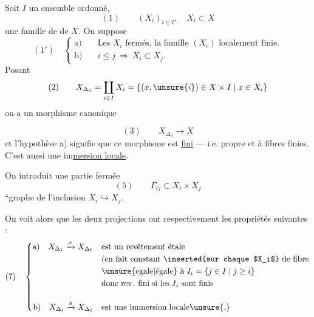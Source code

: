 Soit $I$ un ensemble ordonné, 
\[
(1)\qquad (X_i)_{i\in I},\quad X_i\subset X
\]
une famille de  de $X$. On suppose
\[
(1')\quad\left\{\begin{aligned}
\text{a)}\quad&\text{Les }X_i\text{ fermés, la famille }(X_i)\text{ localement finie.}\\
\text{b)}\quad&i\leq j\ \Longrightarrow\ X_i\subset X_j.
\end{aligned}\right.
\]
Posant
\[
(2)\qquad X_{\Delta_0}=\coprod_{i\in I}X_i
=\{(x,\unsure{i})\in X\times I\mid x\in X_i\}
\]
on a un morphisme canonique

\[
(3)\qquad X_{\Delta_0}\longrightarrow X
\]
et l'hypothèse a) signifie que ce
morphisme  est \uline{fini} --- i.e. propre
 et à fibres finies. C'est aussi une
im\uline{mersion locale}.

On introduit une partie fermée
\[
(5)\qquad \Gamma_{ij}\subset X_i\times X_j
\]
``graphe de l'inclusion $X_i\hookrightarrow X_j$.

On voit alors que les deux projections
ont respectivement les propriétés suivantes :
\[
(7)\quad\left\{\begin{aligned}
\text{a)}\quad X_{\Delta_1}\xrightarrow{\sigma}X_{\Delta_0}&\quad\text{est un revêtement étale}\\
&\quad\text{(en fait constant \inserted{sur chaque $X_i$} de fibre}\\
&\quad\text{\unsure{egale|égale} à }I_i=\{j\in I\mid j\geq i\}\\
&\quad\text{donc rev. fini si les }I_i\text{ sont finis}\\[1em]
\text{b)}\quad X_{\Delta_1}\xrightarrow{b}X_{\Delta_0}&\quad\text{est une immersion locale\unsure{.}}
\end{aligned}\right.
\]

